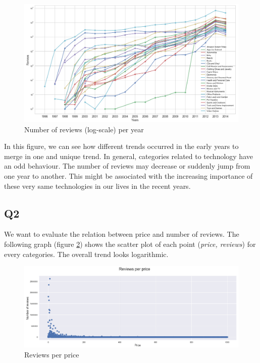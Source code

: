 \documentclass[11pt]{article}
\begin{document}
\begin{figure}[!h]
\centering
\includegraphics[width=1\linewidth]{q1.png}
\caption{Number of reviews (log-scale) per year}
\label{q1}
\end{figure}

In this figure, we can see how different trends occurred in the early years to merge in one and unique trend. In general, categories related to technology have an odd behaviour. The number of reviews may decrease or suddenly jump from one year to another. This might be associated with the increasing importance of these very same technologies in our lives in the recent years.


\subsection{Q2}
We want to evaluate the relation between price and number of reviews. The following graph (figure \ref{q2c}) shows the scatter plot of each point ({\em price, reviews}) for every categories. The overall trend looks logarithmic. 

\begin{figure}[!h]
\centering
\includegraphics[width=1\linewidth]{q2c.png}
\caption{Reviews per price}
\label{q2c}
\end{figure}
\end{document}
